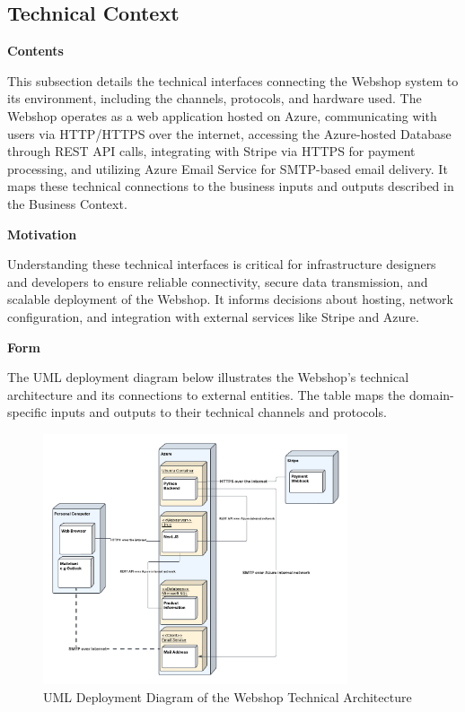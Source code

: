 \hypertarget{_technical_context}{%
\subsection{Technical Context}\label{_technical_context}}

\textbf{Contents}

This subsection details the technical interfaces connecting the Webshop system to its environment, including the channels, protocols, and hardware used. The Webshop operates as a web application hosted on Azure, communicating with users via HTTP/HTTPS over the internet, accessing the Azure-hosted Database through REST API calls, integrating with Stripe via HTTPS for payment processing, and utilizing Azure Email Service for SMTP-based email delivery. It maps these technical connections to the business inputs and outputs described in the Business Context.

\textbf{Motivation}

Understanding these technical interfaces is critical for infrastructure designers and developers to ensure reliable connectivity, secure data transmission, and scalable deployment of the Webshop. It informs decisions about hosting, network configuration, and integration with external services like Stripe and Azure.

\textbf{Form}

The UML deployment diagram below illustrates the Webshop’s technical architecture and its connections to external entities. The table maps the domain-specific inputs and outputs to their technical channels and protocols.

\begin{figure}[h]
  \centering
  \includegraphics[width=0.8\textwidth]{images/webshop_deployment_diagram.pdf} 
  \caption{UML Deployment Diagram of the Webshop Technical Architecture}
  \label{fig:webshop-deployment}
\end{figure}

